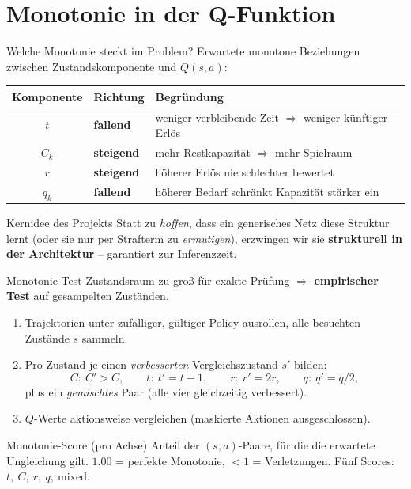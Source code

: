 \documentclass[aspectratio=169, 11pt]{beamer}
\begin{document}
\section{Monotonie in der Q-Funktion}

\begin{frame}{Welche Monotonie steckt im Problem?}
  Erwartete monotone Beziehungen zwischen Zustandskomponente und $Q(s,a)$:

  \medskip
  \begin{center}
  \begin{tabular}{c l l}
    \toprule
    Komponente & Richtung & Begründung \\
    \midrule
    $t$    & \textbf{fallend}   & weniger verbleibende Zeit $\Rightarrow$ weniger künftiger Erlös \\
    $C_k$  & \textbf{steigend}  & mehr Restkapazität $\Rightarrow$ mehr Spielraum \\
    $r$    & \textbf{steigend}  & höherer Erlös nie schlechter bewertet \\
    $q_k$  & \textbf{fallend}   & höherer Bedarf schränkt Kapazität stärker ein \\
    \bottomrule
  \end{tabular}
  \end{center}

  \medskip
  \begin{alertblock}{Kernidee des Projekts}
    Statt zu \emph{hoffen}, dass ein generisches Netz diese Struktur lernt (oder sie nur per Straf\-term
    zu \emph{ermutigen}), erzwingen wir sie \textbf{strukturell in der Architektur} -- garantiert zur Inferenzzeit.
  \end{alertblock}
\end{frame}

\begin{frame}{Monotonie-Test}
  Zustandsraum zu groß für exakte Prüfung $\Rightarrow$ \textbf{empirischer Test} auf gesampelten Zuständen.

  \begin{enumerate}
    \item Trajektorien unter zufälliger, gültiger Policy ausrollen, alle besuchten Zustände $s$ sammeln.
    \item Pro Zustand je einen \emph{verbesserten} Vergleichszustand $s'$ bilden:
      \[
        C{:}\ C' > C, \qquad t{:}\ t' = t-1, \qquad r{:}\ r' = 2r, \qquad q{:}\ q' = q/2,
      \]
      plus ein \emph{gemischtes} Paar (alle vier gleichzeitig verbessert).
    \item $Q$-Werte aktionsweise vergleichen (maskierte Aktionen ausgeschlossen).
  \end{enumerate}

  \begin{block}{Monotonie-Score (pro Achse)}
    Anteil der $(s,a)$-Paare, für die die erwartete Ungleichung gilt.
    $1.00$ = perfekte Monotonie, $<1$ = Verletzungen. Fünf Scores: $t,\ C,\ r,\ q,\ \text{mixed}$.
  \end{block}
\end{frame}
\end{document}
